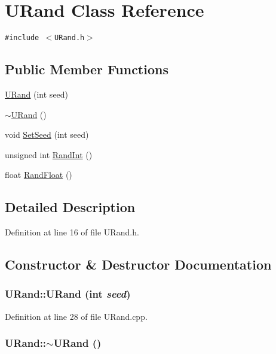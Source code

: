 \hypertarget{class_u_rand}{
\section{URand Class Reference}
\label{class_u_rand}
}
{\tt \#include $<$URand.h$>$}

\subsection*{Public Member Functions}
\begin{CompactItemize}
\item 
\hyperlink{class_u_rand_e6af027153a0f6f6826a83a764102a52}{URand} (int seed)
\item 
\hyperlink{class_u_rand_c111d8278dda03f605045aa8ee1cb799}{$\sim$URand} ()
\item 
void \hyperlink{class_u_rand_547e45e8643d8d2ed250ef1ccc5b0d5b}{SetSeed} (int seed)
\item 
unsigned int \hyperlink{class_u_rand_aa7214050f5f14049e8db4b3fe333dd9}{RandInt} ()
\item 
float \hyperlink{class_u_rand_7ee6d018f0615328bb30d446250f0455}{RandFloat} ()
\end{CompactItemize}


\subsection{Detailed Description}


Definition at line 16 of file URand.h.

\subsection{Constructor \& Destructor Documentation}
\hypertarget{class_u_rand_e6af027153a0f6f6826a83a764102a52}{
\subsubsection[{URand}]{\setlength{\rightskip}{0pt plus 5cm}URand::URand (int {\em seed})}}
\label{class_u_rand_e6af027153a0f6f6826a83a764102a52}




Definition at line 28 of file URand.cpp.\hypertarget{class_u_rand_c111d8278dda03f605045aa8ee1cb799}{
\subsubsection[{$\sim$URand}]{\setlength{\rightskip}{0pt plus 5cm}URand::$\sim$URand ()}}
\label{class_u_rand_c111d8278dda03f605045aa8ee1cb799}




